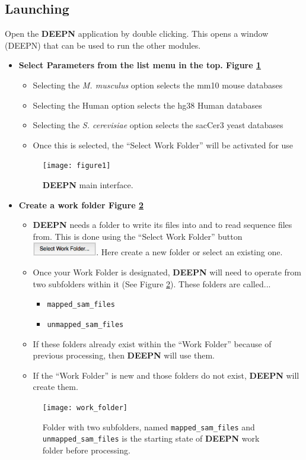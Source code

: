 \documentclass[11pt,fleqn]{book} %
\newcommand{\DEEPN}{\textbf{DEEPN }}
\begin{document}
\subsection{Launching}
Open the \DEEPN application by double clicking. This opens a window (DEEPN) that can be used to run the other modules.
\begin{itemize}
	\item[\textbf{Step 1.}] \textbf{Select Parameters from the list menu in the top. Figure \ref{fig:deepn_main_window}}
	\begin{itemize}
		\item Selecting the \emph{M. musculus} option selects the mm10 mouse databases
    \item Selecting the Human option selects the hg38 Human databases
		\item Selecting the \emph{S. cerevisiae} option selects the sacCer3 yeast databases
		\item Once this is selected, the “Select Work Folder” will be activated for use
	\end{itemize}
	\begin{figure}[!ht]
	    \centering
	    \texttt{[image: figure1]}
	    \caption{\DEEPN main interface.}
	    \label{fig:deepn_main_window}
    \end{figure}
	\item[\textbf{Step 2.}] \textbf{Create a work folder Figure \ref{fig:select_work_folder}}

	\begin{itemize}
		\item \DEEPN needs a folder to write its files into and to read sequence files from.  This is done using the ``Select Work Folder'' button \includegraphics[width=80pt]{Pictures/work_folder_btn}. Here create a new folder or select an existing one.
		\item Once your Work Folder is designated, \DEEPN will need to operate from two subfolders within it (See Figure \ref{fig:select_work_folder}). These folders are called...
		\begin{itemize}
			\item \texttt{mapped\_sam\_files}
			\item \texttt{unmapped\_sam\_files} 
		\end{itemize}
		\item If these folders already exist within the ``Work Folder'' because of previous processing, then \DEEPN will use them.
		\item If the ``Work Folder'' is new and those folders do not exist, \DEEPN will create them.
	\end{itemize}
	\begin{figure}[!ht]
	    \centering
	    \texttt{[image: work\_folder]}
	    \caption{Folder with two subfolders, named \texttt{mapped\_sam\_files} and \texttt{unmapped\_sam\_files} is the starting state of \DEEPN work folder before processing.}
	    \label{fig:select_work_folder}
    \end{figure}


\end{itemize}
\end{document}
